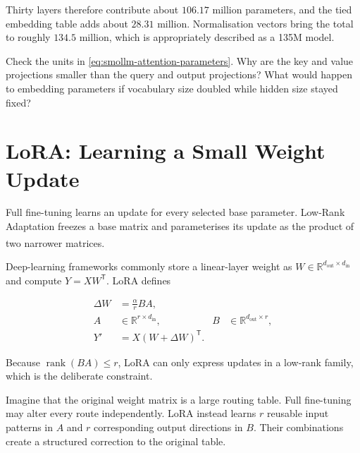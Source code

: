 Thirty layers therefore contribute about $106.17$ million parameters, and the
tied embedding table adds about $28.31$ million.
Normalisation vectors bring the total to roughly $134.5$ million, which is
appropriately described as a 135M model.

\begin{checkpoint}
Check the units in \cref{eq:smollm-attention-parameters}.
Why are the key and value projections smaller than the query and output
projections?
What would happen to embedding parameters if vocabulary size doubled while
hidden size stayed fixed?
\end{checkpoint}

\section{LoRA: Learning a Small Weight Update}

Full fine-tuning learns an update for every selected base parameter.
Low-Rank Adaptation freezes a base matrix and parameterises its update as the
product of two narrower matrices.\textsuperscript{\cite{huLoRALowRank2021}}

Deep-learning frameworks commonly store a linear-layer weight as
$W\in\mathbb{R}^{d_{\mathrm{out}}\times d_{\mathrm{in}}}$ and compute
$Y=XW^{\mathsf T}$.
LoRA defines

\begin{align}
    \Delta W &= \frac{\alpha}{r}BA,
    \label{eq:lora-update}\\
    A &\in\mathbb{R}^{r\times d_{\mathrm{in}}},
    &B &\in\mathbb{R}^{d_{\mathrm{out}}\times r},
    \label{eq:lora-shapes}\\
    Y' &= X(W+\Delta W)^{\mathsf T}.
    \label{eq:lora-forward}
\end{align}

Because $\operatorname{rank}(BA)\leq r$, LoRA can only express updates in a
low-rank family, which is the deliberate constraint.

\begin{plainlanguage}
Imagine that the original weight matrix is a large routing table.
Full fine-tuning may alter every route independently.
LoRA instead learns $r$ reusable input patterns in $A$ and $r$ corresponding
output directions in $B$.
Their combinations create a structured correction to the original table.
\end{plainlanguage}

